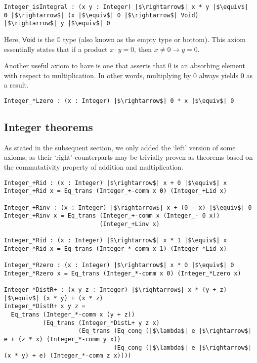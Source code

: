 \documentclass[12pt,twoside,maitrise]{dms}
\theoremstyle{definition}
\numberwithin{equation}{section}
\numberwithin{table}{chapter}
\numberwithin{figure}{chapter}
\newcommand\kw[1] {\textsf{#1}}
\begin{document}
\begin{verbatim}
Integer_isIntegral : (x y : Integer) |$\rightarrow$| x * y |$\equiv$| 0 |$\rightarrow$| (x |$\equiv$| 0 |$\rightarrow$| Void) |$\rightarrow$| y |$\equiv$| 0
\end{verbatim}

Here, $\kw{Void}$ is the $\mathbb{0}$ type (also known as the empty type or
bottom). This axiom essentially states that if a product $x \cdot y = 0$, then
$x \ne 0 \rightarrow y = 0$.

Another useful axiom to have is one that asserts that 0 is an absorbing element
with respect to multiplication. In other words, multiplying by 0 always yields 0
as a result.

\begin{verbatim}
Integer_*Lzero : (x : Integer) |$\rightarrow$| 0 * x |$\equiv$| 0
\end{verbatim}

\subsection*{Integer theorems}\label{subsection:int-theorems}
As stated in the subsequent section, we only added the `left' version of some
axioms, as their `right' counterparts may be trivially proven as theorems based
on the commutativity property of addition and multiplication.

\begin{verbatim}
Integer_+Rid : (x : Integer) |$\rightarrow$| x + 0 |$\equiv$| x
Integer_+Rid x = Eq_trans (Integer_+-comm x 0) (Integer_+Lid x)

Integer_+Rinv : (x : Integer) |$\rightarrow$| x + (0 - x) |$\equiv$| 0
Integer_+Rinv x = Eq_trans (Integer_+-comm x (Integer_- 0 x))
                           (Integer_+Linv x)

Integer_*Rid : (x : Integer) |$\rightarrow$| x * 1 |$\equiv$| x
Integer_*Rid x = Eq_trans (Integer_*-comm x 1) (Integer_*Lid x)

Integer_*Rzero : (x : Integer) |$\rightarrow$| x * 0 |$\equiv$| 0
Integer_*Rzero x = Eq_trans (Integer_*-comm x 0) (Integer_*Lzero x)

Integer_*DistR+ : (x y z : Integer) |$\rightarrow$| x * (y + z) |$\equiv$| (x * y) + (x * z)
Integer_*DistR+ x y z =
  Eq_trans (Integer_*-comm x (y + z))
           (Eq_trans (Integer_*DistL+ y z x)
                     (Eq_trans (Eq_cong (|$\lambda$| e |$\rightarrow$| e + (z * x) (Integer_*-comm y x))
                               (Eq_cong (|$\lambda$| e |$\rightarrow$| (x * y) + e) (Integer_*-comm z x))))
\end{verbatim}
\end{document}
